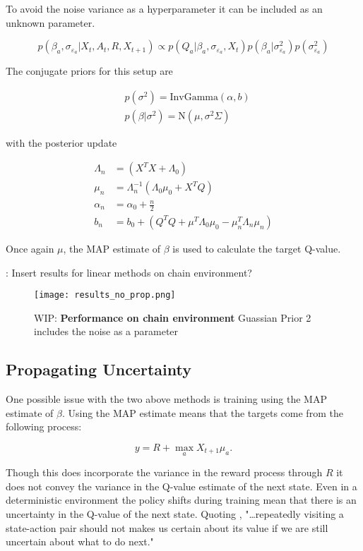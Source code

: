 To avoid the noise variance as a hyperparameter it can be included as an unknown parameter.

$$
p(\beta_a, \sigma_{\varepsilon_a}| X_{t}, A_{t}, R, X_{t+1})\propto p(Q_a|\beta_a, \sigma_{\varepsilon_a}, X_{t})p(\beta_a|\sigma^2_{\varepsilon_a}) p(\sigma^2_{\varepsilon_a})
$$

The conjugate priors for this setup are

\begin{align*}
    & p(\sigma^2) = \text{InvGamma}(\alpha, b)          \\
    & p(\beta|\sigma^2) = \text{N}(\mu, \sigma^2\Sigma) 
\end{align*}

with the posterior update

\begin{align*}
	\Lambda_n & = (X^TX + \Lambda_0)                                         \\
	\mu_n     & = \Lambda_n^{-1}(\Lambda_0\mu_0 + X^TQ)                      \\
	\alpha_n  & = \alpha_0 + \frac{n}{2}                                     \\
	b_n       & = b_0 + (Q^TQ + \mu^T\Lambda_0\mu_0 - \mu_n^T\Lambda_n\mu_n) 
\end{align*}

Once again $\mu$, the MAP estimate of $\beta$ is used to calculate the target Q-value.

\todo: Insert results for linear methods on chain environment?

\begin{figure}[H]
    \centering
    \texttt{[image: results\_no\_prop.png]}
    \caption{WIP: \textbf{Performance on chain environment} Guassian Prior 2 includes the noise as a parameter}
    \label{fig:results_no_propr}
\end{figure}


\subsection{Propagating Uncertainty}

One possible issue with the two above methods is training using the MAP estimate of $\beta$. Using the MAP estimate means that the targets come from the following process:

$$
y = R + \max_a X_{t+1}\mu_a.
$$

Though this does incorporate the variance in the reward process through $R$ it does not convey the variance in the Q-value estimate of the next state. Even in a deterministic environment the policy shifts during training mean that there is an uncertainty in the Q-value of the next state. Quoting \cite{moerland_2017},  "\dots repeatedly visiting a state-action pair should not makes us certain about its value if we are still uncertain about what to do next."

